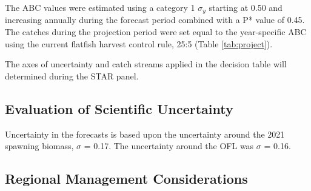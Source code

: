 \documentclass[11pt,
  english,
  a4paper,
]{article}
\begin{document}

The ABC values were estimated using a category 1 {\(\sigma_y\)\leavevmode\tagmcend\tagstructend} starting at 0.50 and increasing annually during the forecast period combined with a P* value of 0.45. The catches during the projection period were set equal to the year-specific ABC using the current flatfish harvest control rule, 25:5 (Table \ref{tab:project}).

\leavevmode\tagmcend\tagstructend\par


The axes of uncertainty and catch streams applied in the decision table will determined during the STAR panel.

\leavevmode\tagmcend\tagstructend\par


\hypertarget{evaluation-of-scientific-uncertainty}{%
\subsection{Evaluation of Scientific Uncertainty}\label{evaluation-of-scientific-uncertainty}}

\leavevmode\tagmcend\tagstructend


Uncertainty in the forecasts is based upon the uncertainty around the 2021 spawning biomass, {\(\sigma\)\leavevmode\tagmcend\tagstructend} = 0.17. The uncertainty around the OFL was {\(\sigma\)\leavevmode\tagmcend\tagstructend} = 0.16.

\leavevmode\tagmcend\tagstructend\par


\hypertarget{regional-management-considerations}{%
\subsection{Regional Management Considerations}\label{regional-management-considerations}}

\leavevmode\tagmcend\tagstructend
\end{document}
